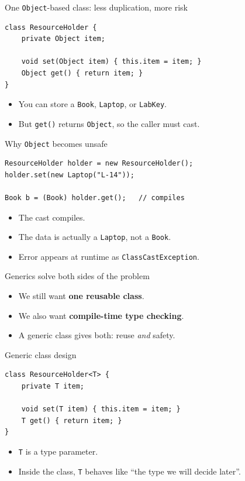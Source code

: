 \documentclass{beamer}
\begin{document}
\begin{frame}[fragile]{One \texttt{Object}-based class: less duplication, more risk}
\begin{lstlisting}
class ResourceHolder {
    private Object item;

    void set(Object item) { this.item = item; }
    Object get() { return item; }
}
\end{lstlisting}
\begin{itemize}[<+->]
  \item You can store a \texttt{Book}, \texttt{Laptop}, or \texttt{LabKey}.
  \item But \texttt{get()} returns \texttt{Object}, so the caller must cast.
\end{itemize}
  \slidesources{\OOPSUnitIVSources}
\end{frame}

\begin{frame}[fragile]{Why \texttt{Object} becomes unsafe}
\begin{lstlisting}
ResourceHolder holder = new ResourceHolder();
holder.set(new Laptop("L-14"));

Book b = (Book) holder.get();   // compiles
\end{lstlisting}
\begin{itemize}[<+->]
  \item The cast compiles.
  \item The data is actually a \texttt{Laptop}, not a \texttt{Book}.
  \item Error appears at runtime as \texttt{ClassCastException}.
\end{itemize}
  \slidesources{\OOPSUnitIVSources}
\end{frame}

\begin{frame}{Generics solve both sides of the problem}
\begin{itemize}[<+->]
  \item We still want \textbf{one reusable class}.
  \item We also want \textbf{compile-time type checking}.
  \item A generic class gives both: reuse \textit{and} safety.
\end{itemize}
  \slidesources{\OOPSUnitIVSources}
\end{frame}

\begin{frame}[fragile]{Generic class design}
\begin{lstlisting}
class ResourceHolder<T> {
    private T item;

    void set(T item) { this.item = item; }
    T get() { return item; }
}
\end{lstlisting}
\begin{itemize}[<+->]
  \item \texttt{T} is a type parameter.
  \item Inside the class, \texttt{T} behaves like ``the type we will decide later''.
\end{itemize}
  \slidesources{\OOPSUnitIVSources}
\end{frame}
\end{document}
